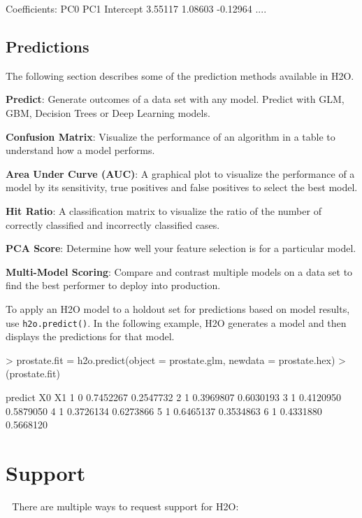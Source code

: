 \documentclass[11pt]{article}
\begin{document}
{\begin{spverbatim}
Coefficients:
      PC0       PC1 Intercept 
  3.55117   1.08603  -0.12964
      ....
\end{spverbatim}


\subsection{Predictions}

The following section describes some of the prediction methods available in H2O. 

{\textbf{Predict}}: Generate outcomes of a data set with any model. Predict with GLM, GBM, Decision Trees or Deep Learning models.\bigskip

{\textbf{Confusion Matrix}}: Visualize the performance of an algorithm in a table to understand how a model performs.\bigskip

{\textbf{Area Under Curve (AUC)}}: A graphical plot to visualize the performance of a model by its sensitivity, true positives and false positives to select the best model.\bigskip

{\textbf{Hit Ratio}}: A classification matrix to visualize the ratio of the number of correctly classified and incorrectly classified cases.\bigskip

{\textbf{PCA Score}}: Determine how well your feature selection is for a particular model.\bigskip

{\textbf{Multi-Model Scoring}}: Compare and contrast multiple models on a data set to find the best performer to deploy into production. 

To apply an H2O model to a holdout set for predictions based on model results, use {\texttt{h2o.predict()}}.  In the following example, H2O generates a model and then displays the predictions for that model. 
\begin{spverbatim}
> prostate.fit = h2o.predict(object = prostate.glm, newdata = prostate.hex)
> (prostate.fit)

        predict        X0        X1
      1       0 0.7452267 0.2547732
      2       1 0.3969807 0.6030193
      3       1 0.4120950 0.5879050
      4       1 0.3726134 0.6273866
      5       1 0.6465137 0.3534863
      6       1 0.4331880 0.5668120
\end{spverbatim}


\section{Support} 
There are multiple ways to request support for H2O: \bigskip

}
\end{document}
